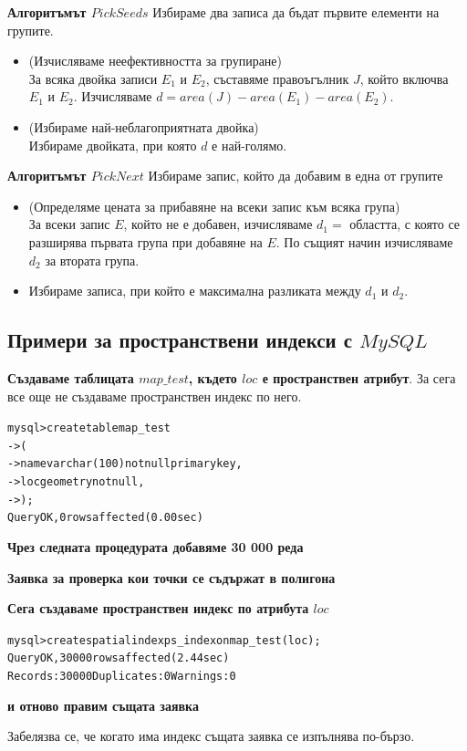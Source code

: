 \documentclass[a4paper,10pt]{article}
\begin{document}
\textbf{Алгоритъмът $PickSeeds$}
Избираме два записа да бъдат първите елементи на групите.
\begin{itemize}
 \item (Изчисляваме неефективността за групиране) \\
За всяка двойка записи $E_{1}$ и $E_{2}$, съставяме правоъгълник $J$, който включва $E_{1}$ и $E_{2}$. 
Изчисляваме $d = area(J) - area(E_{1}) - area(E_{2})$.
\item (Избираме най-неблагоприятната двойка) \\
Избираме двойката, при която $d$ е най-голямо.
\end{itemize}

\textbf{Алгоритъмът $PickNext$}
Избираме запис, който да добавим в една от групите
\begin{itemize}
 \item (Определяме цената за прибавяне на всеки запис към всяка група) \\
За всеки запис $E$, който не е добавен, изчисляваме $d_{1} = $
областта, с която се разширява първата група при добавяне на $E$. 
По същият начин изчисляваме $d_{2}$ за втората група.
\item Избираме записа, при който е максимална разликата  между $d_{1}$ и $d_{2}$.
\end{itemize}



\subsection{Примери за пространствени индекси с $MySQL$}
\textbf{Създаваме таблицата $map\_test$, където $loc$ е пространствен атрибут}. За сега все още не създаваме
пространствен индекс по него.
\begin{alltt}
mysql> create table map_test
    -> (
    ->   name varchar(100) not null primary key,
    ->   loc  geometry not null,
    -> );
Query OK, 0 rows affected (0.00 sec)
\end{alltt}

\textbf{Чрез следната процедурата добавяме 30 000 реда}

\newpage
\textbf{Заявка за проверка кои точки се съдържат в полигона}




\textbf{Сега създаваме пространствен индекс по атрибута $loc$}

\begin{alltt}
mysql> create spatial index ps_index on map_test(loc);
Query OK, 30000 rows affected (2.44 sec)
Records: 30000  Duplicates: 0  Warnings: 0
\end{alltt}

\textbf{и отново правим същата заявка}

Забелязва се, че когато има индекс същата заявка се изпълнява по-бързо.
\end{document}
